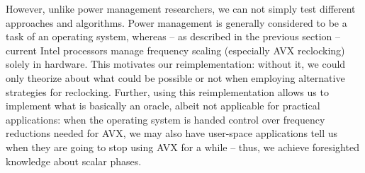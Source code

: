 {However, unlike power management researchers, we can not simply test different approaches and algorithms. Power management is generally considered to be a task of an operating system, whereas -- as described in the previous section -- current Intel processors manage frequency scaling (especially \gls{AVX} reclocking) solely in hardware. This motivates our reimplementation: without it, we could only theorize about what could be possible or not when employing alternative strategies for reclocking. Further, using this reimplementation allows us to implement what is basically an oracle, albeit not applicable for practical applications: when the operating system is handed control over frequency reductions needed for \gls{AVX}, we may also have user-space applications tell us when they are going to stop using \gls{AVX} for a while -- thus, we achieve foresighted knowledge about scalar phases.

}
